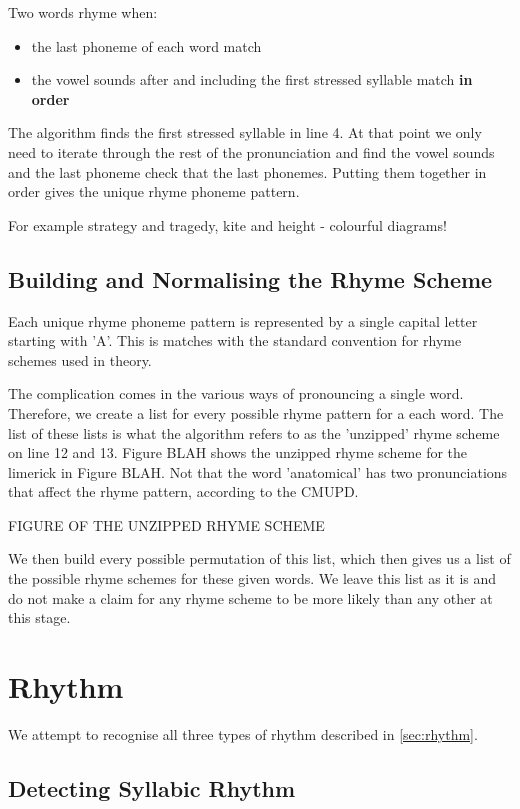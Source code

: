 Two words rhyme when:
\begin{itemize}
\item{the last phoneme of each word match}
\item{the vowel sounds after and including the first stressed syllable match \textbf{in order}}
\end{itemize}

The algorithm finds the first stressed syllable in line 4. At that point we only need to iterate through the rest of the pronunciation and find the vowel sounds and the last phoneme check that the last phonemes. Putting them together in order gives the unique rhyme phoneme pattern. 

For example strategy and tragedy, kite and height - colourful diagrams!			

\subsection{Building and Normalising the Rhyme Scheme}

Each unique rhyme phoneme pattern is represented by a single capital letter starting with 'A'. This is matches with the standard convention for rhyme schemes used in theory. 

The complication comes in the various ways of pronouncing a single word. Therefore, we create a list for every possible rhyme pattern for a each word. The list of these lists is what the algorithm refers to as the 'unzipped' rhyme scheme on line 12 and 13. Figure BLAH shows the unzipped rhyme scheme for the limerick in Figure BLAH. Not that the word 'anatomical' has two pronunciations that affect the rhyme pattern, according to the CMUPD.

FIGURE OF THE UNZIPPED RHYME SCHEME

We then build every possible permutation of this list, which then gives us a list of the possible rhyme schemes for these given words. We leave this list as it is and do not make a claim for any rhyme scheme to be more likely than any other at this stage.

\section{Rhythm}

We attempt to recognise all three types of rhythm described in \ref{sec:rhythm}. 

\subsection{Detecting Syllabic Rhythm}


